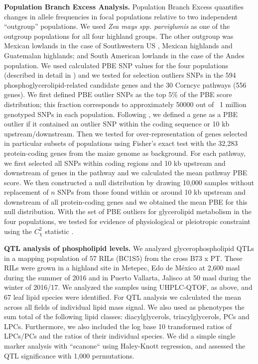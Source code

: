 \documentclass[9pt,twocolumn,twoside,lineno]{BioRxiv}
\begin{document}
\textbf{Population Branch Excess Analysis.}
Population Branch Excess quantifies changes in allele frequencies in focal populations relative to two independent “outgroup” populations.
We used \textit{Zea mays spp. parviglumis} as one of the outgroup populations for all four highland groups.  
The other outgroup was  Mexican lowlands  in the case of Southwestern US , Mexican highlands and Guatemalan highlands; and South American lowlands in the case of the Andes population. 
We used calculated PBE SNP values for the four populations (described in detail in \cite{Wang2020-mp}) and we tested for selection outliers SNPs in the 594 phosphoglycerolipid-related candidate genes and the 30 Corncyc pathways (556 genes).
We first defined PBE outlier SNPs as the top 5\% of the PBE score distribution; this fraction corresponds to approximately 50000 out of ~1 million genotyped SNPs in each population. 
Following \cite{Wang2020-mp}, we defined a gene as a PBE outlier if it contained an outlier SNP within the coding sequence or 10 kb upstream/downstream. 
Then we tested for over-representation of genes selected in particular subsets of populations using Fisher's exact test with the 32,283 protein-coding genes from the maize genome as background. 
For each pathway, we first selected all SNPs within coding regions and 10 kb upstream and downstream of genes in the pathway and we calculated the mean pathway PBE score. 
We then constructed a null distribution by drawing 10,000 samples without replacement of $n$ SNPs from those found within or around 10 kb upstream and downstream of all protein-coding genes and we obtained the mean PBE for this null distribution. 
With the set of PBE outliers for glycerolipid metabolism in the four populations, we tested for evidence of physiological or pleiotropic constraint using the $C_\chi^2$ statistic \cite{yeaman2018}. 

\textbf{QTL analysis of phospholipid levels.}
We analyzed glycerophospholipid QTLs in a mapping population of 57 RILs (BC1S5) from the cross B73 x PT.
These RILs were grown in a highland site in Metepec, Edo de México at 2,600 masl during the summer of 2016 and in Puerto Vallarta, Jalisco at 50 masl during the winter of 2016/17. 
We analyzed the samples using UHPLC-QTOF, as above, and 67 leaf lipid species were identified.
For QTL analysis we calculated the mean across all fields of individual lipid mass signal. 
We also used as phenotypes the sum total of the following lipid classes: diacylglycerols, triacylglycerols, PCs and  LPCs.  
Furthermore,  we also included the log base 10 transformed ratios of LPCs/PCs and the ratios of their individual species. 
We did a simple single marker analysis  with ``scanone`` using Haley-Knott  regression, and assessed the QTL significance with 1,000 permutations.
\end{document}
